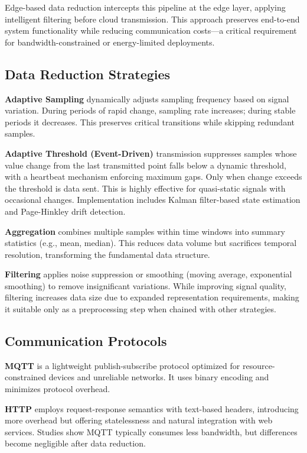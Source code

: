 \documentclass[10pt,twocolumn]{article}
\begin{document}
Edge-based data reduction intercepts this pipeline at the edge layer, applying intelligent filtering before cloud transmission. This approach preserves end-to-end system functionality while reducing communication costs---a critical requirement for bandwidth-constrained or energy-limited deployments.

\subsection{Data Reduction Strategies}

\textbf{Adaptive Sampling} dynamically adjusts sampling frequency based on signal variation. During periods of rapid change, sampling rate increases; during stable periods it decreases. This preserves critical transitions while skipping redundant samples.

\textbf{Adaptive Threshold (Event-Driven)} transmission suppresses samples whose value change from the last transmitted point falls below a dynamic threshold, with a heartbeat mechanism enforcing maximum gaps. Only when change exceeds the threshold is data sent. This is highly effective for quasi-static signals with occasional changes. Implementation includes Kalman filter-based state estimation and Page-Hinkley drift detection.

\textbf{Aggregation} combines multiple samples within time windows into summary statistics (e.g., mean, median). This reduces data volume but sacrifices temporal resolution, transforming the fundamental data structure.

\textbf{Filtering} applies noise suppression or smoothing (moving average, exponential smoothing) to remove insignificant variations. While improving signal quality, filtering increases data size due to expanded representation requirements, making it suitable only as a preprocessing step when chained with other strategies.

\subsection{Communication Protocols}

\textbf{MQTT} is a lightweight publish-subscribe protocol optimized for resource-constrained devices and unreliable networks. It uses binary encoding and minimizes protocol overhead.

\textbf{HTTP} employs request-response semantics with text-based headers, introducing more overhead but offering statelessness and natural integration with web services. Studies show MQTT typically consumes less bandwidth, but differences become negligible after data reduction.
\end{document}
